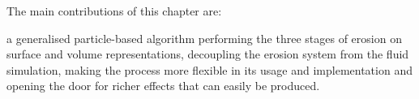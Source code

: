 The main contributions of this chapter are:
\begin{Itemize}
    \Item{} a generalised particle-based algorithm performing the three
    stages of erosion on surface and volume representations,
    \Item{} decoupling the erosion system from the fluid simulation, making the process more flexible in its usage and implementation and opening the door for richer effects that can easily be produced.
\end{Itemize}




